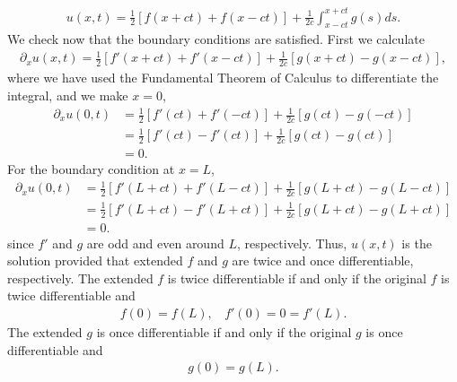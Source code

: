 \begin{questions}
\begin{solution}
\begin{align*}
u(x,t)=\frac{1}{2}\left[f(x+ct)+f(x-ct)\right]+\frac{1}{2c}\int_{x-ct}^{x+ct}g(s)ds.
\end{align*}
We check now that the boundary conditions are satisfied. First we calculate
\begin{align*}
\partial_xu(x,t)=\frac{1}{2}\left[f'(x+ct)+f'(x-ct)\right]+\frac{1}{2c}\left[g(x+ct)-g(x-ct)\right],
\end{align*}
where we have used the Fundamental Theorem of Calculus to differentiate the integral, and we make $x=0$,
\begin{align*}
\partial_xu(0,t)&=\frac{1}{2}\left[f'(ct)+f'(-ct)\right]+\frac{1}{2c}\left[g(ct)-g(-ct)\right]\\
&=\frac{1}{2}\left[f'(ct)-f'(ct)\right]+\frac{1}{2c}\left[g(ct)-g(ct)\right]\\
&=0.
\end{align*}
For the boundary condition at $x=L$,
\begin{align*}
\partial_xu(0,t)&=\frac{1}{2}\left[f'(L+ct)+f'(L-ct)\right]+\frac{1}{2c}\left[g(L+ct)-g(L-ct)\right]\\
&=\frac{1}{2}\left[f'(L+ct)-f'(L+ct)\right]+\frac{1}{2c}\left[g(L+ct)-g(L+ct)\right]\\
&=0.
\end{align*}
since $f'$ and $g$ are odd and even around $L$, respectively. Thus, $u(x,t)$ is the solution provided that extended $f$ and $g$ are twice and once differentiable, respectively. The extended $f$ is twice differentiable if and only if the original $f$ is twice differentiable and
\begin{align*}
f(0)=f(L),~~~~f'(0)=0=f'(L).
\end{align*}
The extended $g$ is once differentiable if and only if the original $g$ is once differentiable and
\begin{align*}
g(0)=g(L).
\end{align*}
\end{solution}

\end{questions}